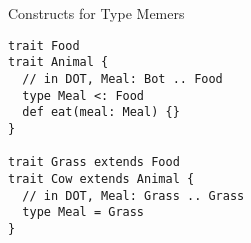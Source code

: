 \documentclass{beamer}
\begin{document}
\begin{frame}[fragile]{Constructs for Type Memers}
\begin{verbatim}
trait Food
trait Animal {
  // in DOT, Meal: Bot .. Food
  type Meal <: Food
  def eat(meal: Meal) {}
}

trait Grass extends Food
trait Cow extends Animal {
  // in DOT, Meal: Grass .. Grass
  type Meal = Grass
}
\end{verbatim}
\end{frame}
\end{document}

